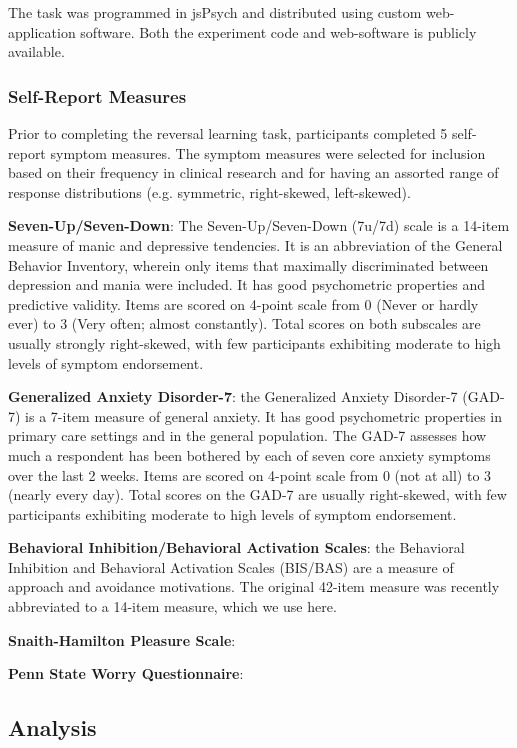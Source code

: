\documentclass[a4paper,notitlepage,12pt]{article}
\begin{document}
The task was programmed in jsPsych and distributed using custom web-application software. Both the experiment code and web-software is publicly available.

\subsubsection{Self-Report Measures}

Prior to completing the reversal learning task, participants completed 5 self-report symptom measures. The symptom measures were selected for inclusion based on their frequency in clinical research and for having an assorted range of response distributions (e.g. symmetric, right-skewed, left-skewed).

\textbf{Seven-Up/Seven-Down}: The Seven-Up/Seven-Down (7u/7d) scale is a 14-item measure of manic and depressive tendencies. It is an abbreviation of the General Behavior Inventory, wherein only items that maximally discriminated between depression and mania were included. It has good psychometric properties and predictive validity. Items are scored on 4-point scale from 0 (Never or hardly ever) to 3 (Very often; almost constantly). Total scores on both subscales are usually strongly right-skewed, with few participants exhibiting moderate to high levels of symptom endorsement. 

\textbf{Generalized Anxiety Disorder-7}: the Generalized Anxiety Disorder-7 (GAD-7) is a 7-item measure of general anxiety. It has good psychometric properties in primary care settings and in the general population. The GAD-7 assesses how much a respondent has been bothered by each of seven core anxiety symptoms over the last 2 weeks. Items are scored on 4-point scale from 0 (not at all) to 3 (nearly every day). Total scores on the GAD-7 are usually right-skewed, with few participants exhibiting moderate to high levels of symptom endorsement.

\textbf{Behavioral Inhibition/Behavioral Activation Scales}: the Behavioral Inhibition and Behavioral Activation Scales (BIS/BAS) are a measure of approach and avoidance motivations. The original 42-item measure was recently abbreviated to a 14-item measure, which we use here.

\textbf{Snaith-Hamilton Pleasure Scale}:

\textbf{Penn State Worry Questionnaire}:

\subsection{Analysis}
\end{document}
